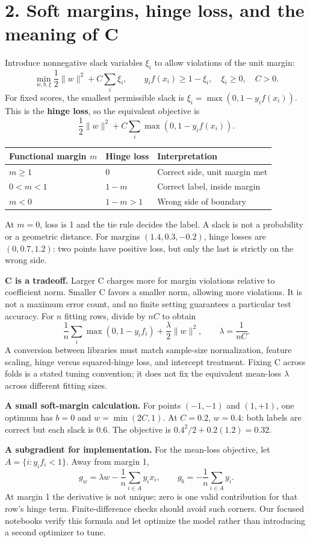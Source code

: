 \documentclass[11pt,a4paper]{article}
\newcommand{\code}[1]{\texttt{\small\detokenize{#1}}}
\begin{document}
\newpage
\section*{2. Soft margins, hinge loss, and the meaning of C}
Introduce nonnegative slack variables $\xi_i$ to allow violations of the unit margin:
\[
\min_{w,b,\xi}\frac12\|w\|^2+C\sum_i\xi_i,
\qquad y_i f(x_i)\ge1-\xi_i,\quad \xi_i\ge0,\quad C>0.
\]
For fixed scores, the smallest permissible slack is $\xi_i=\max(0,1-y_i f(x_i))$.
This is the \textbf{hinge loss}, so the equivalent objective is
\[
\boxed{\frac12\|w\|^2+C\sum_i\max(0,1-y_if(x_i)).}
\]
\begin{center}
\begin{tabular}{lll}\toprule
Functional margin $m$&Hinge loss&Interpretation\\\midrule
$m\ge1$&0&Correct side, unit margin met\\
$0<m<1$&$1-m$&Correct label, inside margin\\
$m<0$&$1-m>1$&Wrong side of boundary\\\bottomrule
\end{tabular}
\end{center}
At $m=0$, loss is 1 and the tie rule decides the label. A slack is not a probability or a geometric distance.
For margins $(1.4,0.3,-0.2)$, hinge losses are $(0,0.7,1.2)$: two points have positive loss,
but only the last is strictly on the wrong side.

\textbf{C is a tradeoff.} Larger C charges more for margin violations relative to coefficient norm.
Smaller C favors a smaller norm, allowing more violations. It is not a maximum error count,
and no finite setting guarantees a particular test accuracy.
For $n$ fitting rows, divide by $nC$ to obtain
\[
\frac1n\sum_i\max(0,1-y_if_i)+\frac\lambda2\|w\|^2,
\qquad \boxed{\lambda=\frac1{nC}}.
\]
A conversion between libraries must match sample-size normalization, feature scaling, hinge versus
squared-hinge loss, and intercept treatment. Fixing C across folds is a stated tuning convention;
it does not fix the equivalent mean-loss $\lambda$ across different fitting sizes.

\textbf{A small soft-margin calculation.} For points $(-1,-1)$ and $(1,+1)$, one optimum has $b=0$ and
$w=\min(2C,1)$. At $C=0.2$, $w=0.4$: both labels are correct but each slack is 0.6.
The objective is $0.4^2/2+0.2(1.2)=0.32$.

\textbf{A subgradient for implementation.} For the mean-loss objective, let $A=\{i:y_if_i<1\}$.
Away from margin 1,
\[
g_w=\lambda w-\frac1n\sum_{i\in A}y_ix_i,\qquad
g_b=-\frac1n\sum_{i\in A}y_i.
\]
At margin 1 the derivative is not unique; zero is one valid contribution for that row's hinge term.
Finite-difference checks should avoid such corners. Our focused notebooks verify this formula and let
\code{SVC} optimize the model rather than introducing a second optimizer to tune.
\end{document}
